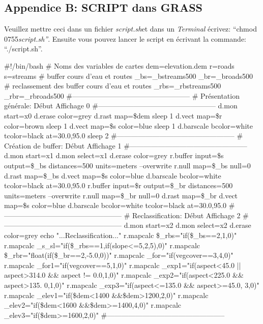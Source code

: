 \newpage

\subsection{Appendice B: SCRIPT dans GRASS}
\label{appendixB}

Veuillez mettre ceci dans un fichier \textit{script.sh}\textup{et dans un }\textit{Terminal}\textup{ \'ecrivez: ``chmod 0755}\textit{script.sh''}\textup{. Ensuite vous pouvez lancer le script }en \'ecrivant la commande: ``./script.sh''.

\begin{smallverbatim}
#!/bin/bash
# Noms des variables de cartes
dem=elevation.dem
r=roads
s=streams
# buffer cours d'eau et routes
_bs=_bstreams500
_br=_broads500
# reclassement des buffer cours d'eau et routes
_rbs=_rbstreams500
_rbr=_rbroads500
#--------------------------------------------------
# Pr\'esentation g\'en\'erale: D\'ebut Affichage 0
#--------------------------------------------------
d.mon start=x0
d.erase color=grey
d.rast map=\$dem
sleep 1
d.vect map=\$r color=brown
sleep 1
d.vect map=\$s color=blue
sleep 1
d.barscale bcolor=white tcolor=black at=30.0,95.0
sleep 2
#--------------------------------------------------
# Cr\'eation de buffer: D\'ebut Affichage 1
#--------------------------------------------------
d.mon start=x1
d.mon select=x1
d.erase color=grey
r.buffer input=\$s output=\$_bs distances=500
 units=meters --overwrite
r.null map=\$_bs null=0
d.rast map=\$_bs
d.vect map=\$s color=blue
d.barscale bcolor=white tcolor=black at=30.0,95.0
r.buffer input=\$r output=\$_br distances=500
 units=meters --overwrite
r.null map=\$_br null=0
d.rast map=\$_br
d.vect map=\$s color=blue
d.barscale bcolor=white tcolor=black at=30.0,95.0
#--------------------------------------------------
# Reclassification: D\'ebut Affichage 2
#--------------------------------------------------
d.mon start=x2
d.mon select=x2
d.erase color=grey
echo "...Reclassification..."
r.mapcalc \$_rbs="if(\$_bs==2,1,0)"
r.mapcalc _s_sl="if(\$_rbs==1,if(slope<=5,2,5),0)"
r.mapcalc \$_rbr="float(if(\$_br==2,-5.0,0))"
r.mapcalc _for="if(vegcover==3,4,0)"
r.mapcalc _for1="if(vegcover==5,1,0)"
r.mapcalc _exp1="if(aspect<45.0 || aspect>314.0 &&
 aspect != 0.0,1,0)"
r.mapcalc _exp2="if(aspect<225.0 && aspect>135.
 0,1,0)"
r.mapcalc _exp3="if(aspect<=135.0 && aspect>=45.0,
 3,0)"
r.mapcalc _elev1="if(\$dem<1400 &&\$dem>1200,2,0)"
r.mapcalc _elev2="if(\$dem<1600 &&\$dem>=1400,4,0)"
r.mapcalc _elev3="if(\$dem>=1600,2,0)"
#--------------------------------------------------

\end{smallverbatim}
